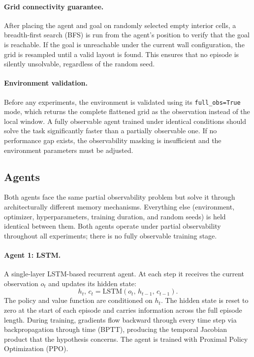 \documentclass[11pt,a4paper]{article}
\begin{document}
\paragraph{Grid connectivity guarantee.}
After placing the agent and goal on randomly selected empty interior cells, a breadth-first search (BFS) is run from the agent's position to verify that the goal is reachable. If the goal is unreachable under the current wall configuration, the grid is resampled until a valid layout is found. This ensures that no episode is silently unsolvable, regardless of the random seed.

\paragraph{Environment validation.}
Before any experiments, the environment is validated using its \texttt{full\_obs=True} mode, which returns the complete flattened grid as the observation instead of the local window. A fully observable agent trained under identical conditions should solve the task significantly faster than a partially observable one. If no performance gap exists, the observability masking is insufficient and the environment parameters must be adjusted.

\subsection{Agents}

Both agents face the same partial observability problem but solve it through architecturally different memory mechanisms. Everything else (environment, optimizer, hyperparameters, training duration, and random seeds) is held identical between them. Both agents operate under partial observability throughout all experiments; there is no fully observable training stage.

\paragraph{Agent 1: LSTM.}
A single-layer LSTM-based recurrent agent. At each step it receives the current observation $o_t$ and updates its hidden state:
\begin{equation}
  h_t,\, c_t = \mathrm{LSTM}\!\left(o_t,\, h_{t-1},\, c_{t-1}\right).
\end{equation}
The policy and value function are conditioned on $h_t$. The hidden state is reset to zero at the start of each episode and carries information across the full episode length. During training, gradients flow backward through every time step via backpropagation through time (BPTT), producing the temporal Jacobian product that the hypothesis concerns. The agent is trained with Proximal Policy Optimization (PPO).
\end{document}
